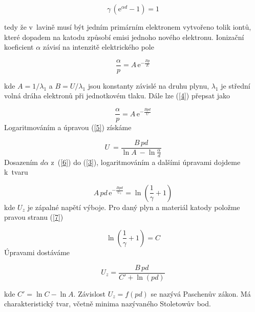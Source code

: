 \documentclass[a4paper,12pt]{article}
\newcommand{\e}{\text{e}}
\begin{document}
\begin{equation}
	\gamma\,(\e^{\alpha d } - 1) = 1
	\label{3}
\end{equation} 

tedy že v~lavině musí být jedním primárním elektronem vytvořeno tolik iontů, které dopadem na katodu způsobí emisi jednoho nového elektronu. Ionizační koeficient $\alpha$ závisí na intenzitě elektrického pole 

\begin{equation}
	\frac{\alpha}{p} = A\,\e^{-\frac{Bp}{E}} 
	\label{4}
\end{equation}

kde $A = 1/\lambda_1$ a $B = U/\lambda_1$ jsou konstanty závislé na druhu plynu, $\lambda_1$ je střední volná dráha elektronů při jednotkovém tlaku. Dále lze (\ref{4}) přepsat jako

\begin{equation}
	\frac{\alpha}{p} = A\,\e^{-\frac{Bpd}{U}} 
	\label{5}
\end{equation}
Logaritmováním a úpravou (\ref{5}) získáme

\begin{equation}
	U~= \frac{B\,pd}{\ln A~- \ln \frac{\alpha}{d}}
	\label{6}
\end{equation}
Dosazením $d\alpha$ z~(\ref{6}) do (\ref{3}), logaritmováním a dalšími úpravami 
dojdeme k~tvaru

\begin{equation}
	A\,pd\,\e^{-\frac{Bpd}{U_z}} = \ln \left(\frac{1}{\gamma} + 1\right)
	\label{7}
\end{equation}
kde $U_z$ je zápalné napětí výboje. Pro daný plyn a materiál katody položme pravou stranu (\ref{7})

\begin{equation}
	\ln \left(\frac{1}{\gamma} + 1\right) = C
	\label{8}
\end{equation}
Úpravami dostáváme

\begin{equation}
	U_z = \frac{B\,pd}{C' + \ln(pd)}
	\label{9}
\end{equation}

kde $C' = \ln C - \ln A$. Závislost $U_z = f (pd)$ se nazývá Paschenův zákon. 
Má charakteristický tvar, včetně minima nazývaného Stoletowův bod.
\end{document}
